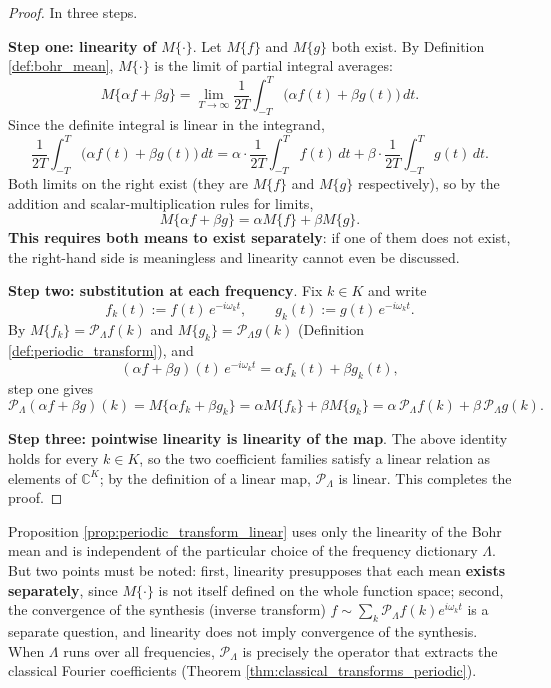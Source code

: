 \begin{proof}
In three steps.

\textbf{Step one: linearity of $M\{\cdot\}$}. Let $M\{f\}$ and $M\{g\}$ both exist. By Definition \ref{def:bohr_mean}, $M\{\cdot\}$ is the limit of partial integral averages:
\[
M\{\alpha f + \beta g\}
= \lim_{T \to \infty} \frac{1}{2T}\int_{-T}^{T} \bigl( \alpha f(t) + \beta g(t) \bigr)\,dt .
\]
Since the definite integral is linear in the integrand,
\[
\frac{1}{2T}\int_{-T}^{T} \bigl( \alpha f(t) + \beta g(t) \bigr)\,dt
= \alpha \cdot \frac{1}{2T}\int_{-T}^{T} f(t)\,dt + \beta \cdot \frac{1}{2T}\int_{-T}^{T} g(t)\,dt .
\]
Both limits on the right exist (they are $M\{f\}$ and $M\{g\}$ respectively), so by the addition and scalar-multiplication rules for limits,
\[
M\{\alpha f + \beta g\} = \alpha M\{f\} + \beta M\{g\} .
\]
\textbf{This requires both means to exist separately}: if one of them does not exist, the right-hand side is meaningless and linearity cannot even be discussed.

\textbf{Step two: substitution at each frequency}. Fix $k \in K$ and write
\[
f_k(t) := f(t)\,e^{-i\omega_k t},\qquad g_k(t) := g(t)\,e^{-i\omega_k t}.
\]
By $M\{f_k\} = \mathcal{P}_\Lambda f(k)$ and $M\{g_k\} = \mathcal{P}_\Lambda g(k)$ (Definition \ref{def:periodic_transform}), and
\[
(\alpha f + \beta g)(t)\,e^{-i\omega_k t} = \alpha f_k(t) + \beta g_k(t),
\]
step one gives
\[
\mathcal{P}_\Lambda(\alpha f + \beta g)(k)
= M\{\alpha f_k + \beta g_k\}
= \alpha M\{f_k\} + \beta M\{g_k\}
= \alpha\, \mathcal{P}_\Lambda f(k) + \beta\, \mathcal{P}_\Lambda g(k).
\]

\textbf{Step three: pointwise linearity is linearity of the map}. The above identity holds for every $k \in K$, so the two coefficient families satisfy a linear relation as elements of $\mathbb{C}^K$; by the definition of a linear map, $\mathcal{P}_\Lambda$ is linear. This completes the proof.
\end{proof}

\begin{remark}
Proposition \ref{prop:periodic_transform_linear} uses only the linearity of the Bohr mean and is independent of the particular choice of the frequency dictionary $\Lambda$. But two points must be noted: first, linearity presupposes that each mean \textbf{exists separately}, since $M\{\cdot\}$ is not itself defined on the whole function space; second, the convergence of the synthesis (inverse transform) $f \sim \sum_k \mathcal{P}_\Lambda f(k) e^{i\omega_k t}$ is a separate question, and linearity does not imply convergence of the synthesis. When $\Lambda$ runs over all frequencies, $\mathcal{P}_\Lambda$ is precisely the operator that extracts the classical Fourier coefficients (Theorem \ref{thm:classical_transforms_periodic}).
\end{remark}


